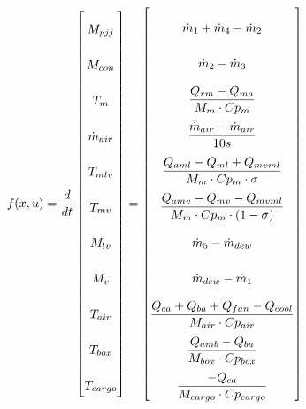 \begin{equation} \label{eq:f_noSub} \renewcommand{\arraystretch}{2.4}
	f(x,u) =  \dfrac{d}{dt} \begin{bmatrix}
		M_{pjj}			\\				%
		M_{con} 		\\				%
		T_m 			\\				%
		\dot{m}_{air}	\\				%
		T_{mlv}			\\				%
		T_{mv}			\\				%
		M_{lv}			\\				%
		M_v				\\				%
		T_{air}			\\				%
		T_{box}			\\				%
		T_{cargo}		\\				%

	\end{bmatrix}
	=
	\begin{bmatrix}
		\dot{m}_1 + \dot{m}_4 - \dot{m}_2 \\										%
		\dot{m}_{2} - \dot{m}_{3}	\\												%
		\dfrac{Q_{rm} - Q_{ma}}{M_m \cdot Cp_m} \\									%
		\dfrac{\bar{\dot{m}}_{air}  - \dot{m}_{air}} {10s}		\\					%
		\dfrac{Q_{aml}-Q_{ml} + Q_{mvml}}{M_m \cdot Cp_m \cdot \sigma}        \\	%
		\dfrac{Q_{amv} - Q_{mv} - Q_{mvml}}{M_m \cdot Cp_m \cdot (1- \sigma)}	\\	%
		\dot{m}_{5} - \dot{m}_{dew}		\\											%
		\dot{m}_{dew} - \dot{m}_{1}	\\												%
		\dfrac{Q_{ca} + Q_{ba} + Q_{fan} -Q_{cool}}{M_{air} \cdot Cp_{air}} \\		%
		\dfrac{Q_{amb} - Q_{ba}}{M_{box} \cdot Cp_{box}} \\							%
		\dfrac{-Q_{ca}}{M_{cargo} \cdot Cp_{cargo}}									%
	\end{bmatrix}
\end{equation}






